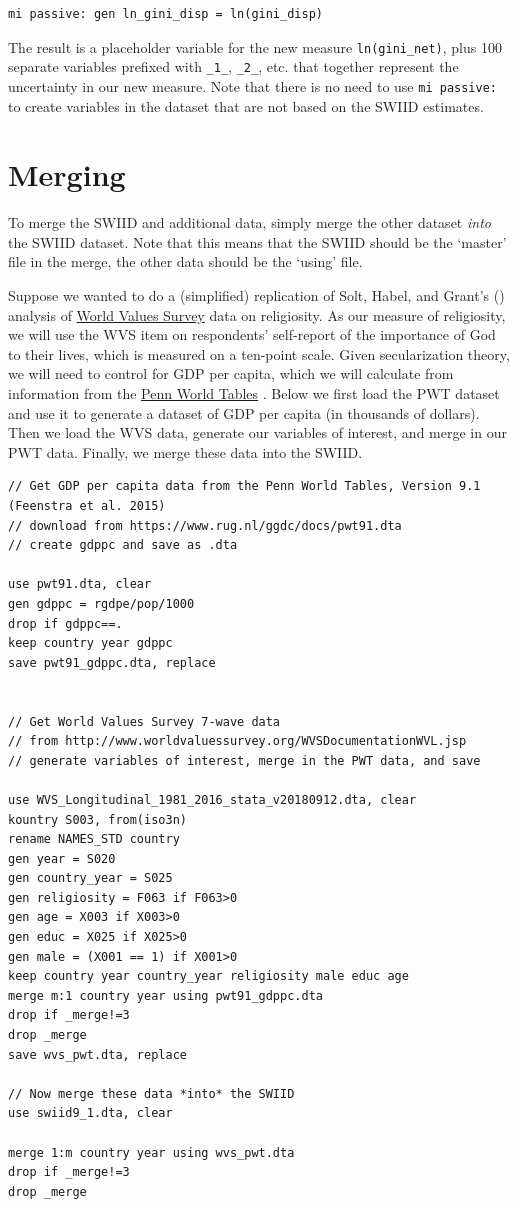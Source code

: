 \documentclass[11pt]{article}
\begin{document}
\begin{verbatim}
mi passive: gen ln_gini_disp = ln(gini_disp)
\end{verbatim}

The result is a placeholder variable for the new measure \verb+ln(gini_net)+, plus 100 separate variables prefixed with \verb+_1_+, \verb+_2_+, etc. that together represent the uncertainty in our new measure.  Note that there is no need to use \verb+mi passive:+ to create variables in the dataset that are not based on the SWIID estimates.

\section{Merging}
To merge the SWIID and additional data, simply merge the other dataset \emph{into} the SWIID dataset.  Note that this means that the SWIID should be the `master' file in the merge, the other data should be the `using' file. 

Suppose we wanted to do a (simplified) replication of Solt, Habel, and Grant's (\citeyear{Solt2011a}) analysis of \href{http://worldvaluessurvey.org}{World Values Survey} data on religiosity.  As our measure of religiosity, we will use the WVS item on respondents' self-report of the importance of God to their lives, which is measured on a ten-point scale.  Given secularization theory, we will need to control for GDP per capita, which we will calculate from information from the \href{www.ggdc.net/pwt}{Penn World Tables} \citep{Feenstra2015}.  Below we first load the PWT dataset and use it to generate a dataset of GDP per capita (in thousands of dollars).  Then we load the WVS data, generate our variables of interest, and merge in our PWT data.  Finally, we merge these data into the SWIID.

\begin{verbatim}
// Get GDP per capita data from the Penn World Tables, Version 9.1 (Feenstra et al. 2015)
// download from https://www.rug.nl/ggdc/docs/pwt91.dta
// create gdppc and save as .dta

use pwt91.dta, clear
gen gdppc = rgdpe/pop/1000
drop if gdppc==.
keep country year gdppc
save pwt91_gdppc.dta, replace


// Get World Values Survey 7-wave data 
// from http://www.worldvaluessurvey.org/WVSDocumentationWVL.jsp
// generate variables of interest, merge in the PWT data, and save

use WVS_Longitudinal_1981_2016_stata_v20180912.dta, clear
kountry S003, from(iso3n)
rename NAMES_STD country
gen year = S020
gen country_year = S025 
gen religiosity = F063 if F063>0
gen age = X003 if X003>0
gen educ = X025 if X025>0
gen male = (X001 == 1) if X001>0
keep country year country_year religiosity male educ age
merge m:1 country year using pwt91_gdppc.dta
drop if _merge!=3
drop _merge
save wvs_pwt.dta, replace

// Now merge these data *into* the SWIID
use swiid9_1.dta, clear

merge 1:m country year using wvs_pwt.dta
drop if _merge!=3
drop _merge

\end{verbatim}
\end{document}
